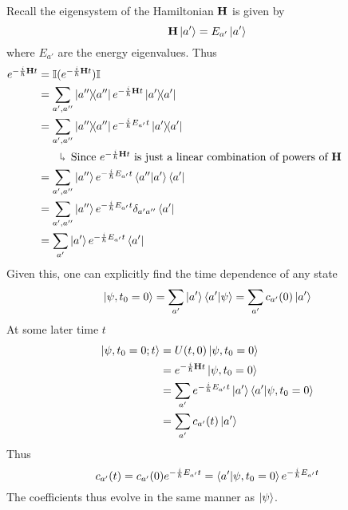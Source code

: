 \documentclass[12pt,a4paper,titlepage]{article}
\newcommand{\explain}[1]{%
	\quad\rotatebox[origin=c]{180}{\enskip$\Lsh$}\hfill
	\begin{minipage}[t]{\dimexpr\linewidth-8em\relax}
	#1
	\end{minipage}\hspace{4em}\bigskip
}
\begin{document}
Recall the eigensystem of the Hamiltonian $\vb{H}$ is given by
\begin{equation}
\vb{H}\ket{a'}=E_{a'}\ket{a'}
\end{equation}
where $E_{a'}$ are the energy eigenvalues. Thus
\begin{equation}
\begin{aligned}
e^{-\frac{i}{\hbar}\vb{H}t}&=\mathbb{I}(e^{-\frac{i}{\hbar}\vb{H}t})\mathbb{I}\\
&=\sum_{a',a''}\op{a''}e^{-\frac{i}{\hbar}\vb{H}t}\op{a'}\\
&=\sum_{a',a''}\op{a''}e^{-\frac{i}{\hbar}E_{a'}t}\op{a'}\\
&\quad\explain{Since $e^{-\frac{i}{\hbar}\vb{H}t}$ is just a linear combination of powers of $\vb{H}$}\\
&=\sum_{a',a''}\ket{a''}e^{-\frac{i}{\hbar}E_{a'}t}\ip{a''}{a'}\bra{a'}\\
&=\sum_{a',a''}\ket{a''}e^{-\frac{i}{\hbar}E_{a'}t}\delta_{a'a''}\bra{a'}\\
&=\sum_{a'}\ket{a'}e^{-\frac{i}{\hbar}E_{a'}t}\bra{a'}
\end{aligned}
\end{equation}
Given this, one can explicitly find the time dependence of any state
\begin{equation}
\ket{\psi,t_{0}=0}=\sum_{a'}\ket{a'}\ip{a'}{\psi}=\sum_{a'}c_{a'}(0)\ket{a'}
\end{equation}
At some later time $t$
\begin{equation}
\begin{aligned}
\ket{\psi,t_{0}=0;t}&=U(t,0)\ket{\psi,t_{0}=0}\\
&=e^{-\frac{i}{\hbar}\vb{H}t}\ket{\psi,t_{0}=0}\\
&=\sum_{a'}e^{-\frac{i}{\hbar}E_{a'}t}\ket{a'}\ip{a'}{\psi,t_{0}=0}\\
&=\sum_{a'}c_{a'}(t)\ket{a'}
\end{aligned}
\end{equation}
Thus
\begin{equation}
c_{a'}(t)=c_{a'}(0)e^{-\frac{i}{\hbar}E_{a'}t}=\ip{a'}{\psi,t_{0}=0}e^{-\frac{i}{\hbar}E_{a'}t}
\end{equation}
The coefficients thus evolve in the same manner as $\ket{\psi}$.
\end{document}
